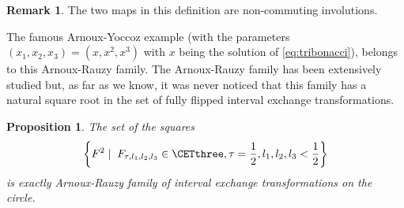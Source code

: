 \documentclass[12pt]{article}
\newtheorem{proposition}{Proposition}
\theoremstyle{definition}
\newtheorem*{remark}{Remark}
\begin{document}
\begin{remark}
The two maps  in this definition are non-commuting involutions.
\end{remark}

The famous Arnoux-Yoccoz example (with the parameters $(x_1,x_2,x_3)=(x,x^2,x^3)$ with $x$ being the solution of \eqref{eq:tribonacci}), belongs to this Arnoux-Rauzy family. 
The Arnoux-Rauzy family has been extensively studied \cite{A88, AR91, AHS16, AHS16-1} but, as far as we know, it was never noticed that this family has a natural square root in the set of fully flipped interval exchange transformations.

\begin{proposition}\label{prop:the_squares_are_Rauzy}
The set of the squares
\begin{equation*}
\left\{ 
F^2 \mid \; F_{\tau, l_1, l_2, l_3} \in \CETthree, \tau=\frac{1}{2}, l_1, l_2, l_3 < \frac{1}{2}
\right\}
\end{equation*}
 is exactly Arnoux-Rauzy family of interval exchange transformations on the circle. 
\end{proposition}
\end{document}
